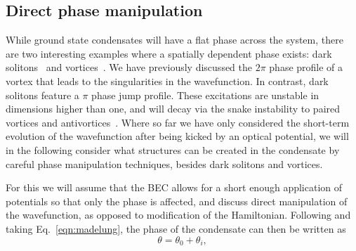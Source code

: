 \subsection{Direct phase manipulation}\label{sec:phase}

While ground state condensates will have a flat phase across the system, there are two interesting examples where a spatially dependent phase exists: dark solitons~\cite{BEC:Denschlag_science_2000} and vortices~\cite{Vtx:Dobrek_pra_1999}. We have previously discussed the $2\pi$ phase profile of a vortex that leads to the singularities in the wavefunction. In contrast, dark solitons feature a $\pi$ phase jump profile. These excitations are unstable in dimensions higher than one, and will decay via the snake instability to paired vortices and antivortices~\cite{Optics Letters Vol. 21, Issue 15, pp. 1129-1131 (1996), Phys. Rev. Lett. 86, 2926 (2001), BEC:Brand_pra_2002}. Where so far we have only considered the short-term evolution of the wavefunction after being kicked by an optical potential, we will in the following consider what structures can be created in the condensate by careful phase manipulation techniques, besides dark solitons and vortices.

For this we will assume that the BEC allows for a short enough application of potentials so that only the phase is affected, and discuss direct manipulation of the wavefunction, as opposed to modification of the Hamiltonian. Following \cite{BK:Pitaevskii_Stringari_2003} and taking Eq.~\eqref{eqn:madelung}, the phase of the condensate can then be written as
\begin{equation}
\theta = \theta_0 + \theta_i,
\end{equation}

